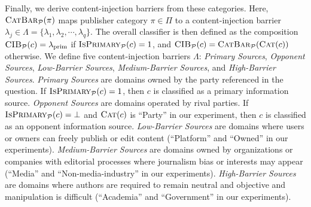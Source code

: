 Finally, we derive content-injection barriers from these categories.
Here, $\textsc{CatBar}_{\mathcal{P}}(\pi)$ maps publisher category $\pi \in \Pi$ to a content-injection barrier $\lambda_j \in \Lambda = \{\lambda_1, \lambda_2, \cdots, \lambda_q\}$.
The overall classifier is then defined as the composition $\textsc{CIB}_{\mathcal{P}}(c) = \lambda_{\text{prim}}$ if $\textsc{IsPrimary}_{\mathcal{P}}(c) = 1$, and $\textsc{CIB}_{\mathcal{P}}(c) = \textsc{CatBar}_{\mathcal{P}}(\textsc{Cat}(c))$ otherwise.
We define five content-injection barriers $\Lambda$: \emph{Primary Sources}, \emph{Opponent Sources}, \emph{Low-Barrier Sources}, \emph{Medium-Barrier Sources}, and \emph{High-Barrier Sources}.
\emph{Primary Sources} are domains owned by the party referenced in the question. If $\textsc{IsPrimary}_{\mathcal{P}}(c) = 1$, then $c$ is classified as a primary information source.
\emph{Opponent Sources} are domains operated by rival parties. If $\textsc{IsPrimary}_{\mathcal{P}}(c) = \bot$ and $\textsc{Cat}(c)$ is ``Party'' in our experiment, then $c$ is classified as an opponent information source.
\emph{Low-Barrier Sources} are domains where users or owners can freely publish or edit content (``Platform'' and ``Owned'' in our experiments).
\emph{Medium-Barrier Sources} are domains owned by organizations or companies with editorial processes where journalism bias or interests may appear (``Media'' and ``Non-media-industry'' in our experiments).
\emph{High-Barrier Sources} are domains where authors are required to remain neutral and objective and manipulation is difficult (``Academia'' and ``Government'' in our experiments).
